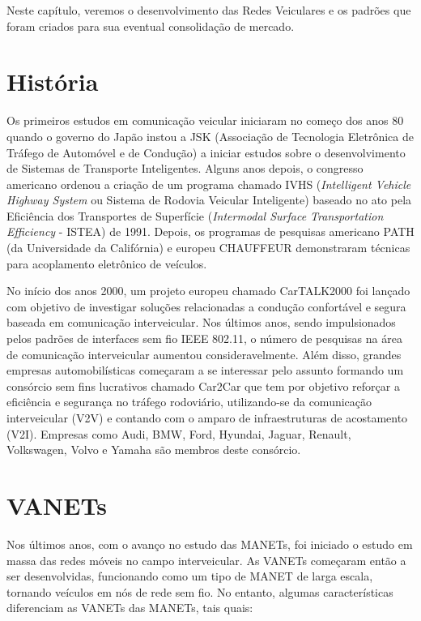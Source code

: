 \documentclass[
12pt,				%
openright,			%
oneside,			%
a4paper,			%
brazil,				%
]{abntex2}
\begin{document}
	\par Neste capítulo, veremos  o desenvolvimento das Redes Veiculares e os padrões que foram criados para sua eventual consolidação de mercado.
	
	\section{História}
	
	\indent Os primeiros estudos em comunicação veicular iniciaram no começo dos anos 80 quando o governo do Japão instou a JSK (Associação de Tecnologia Eletrônica de Tráfego de Automóvel e de Condução) a iniciar estudos sobre o desenvolvimento de Sistemas de Transporte Inteligentes. Alguns anos depois, o congresso americano ordenou a criação de um programa chamado IVHS (\textit{Intelligent Vehicle Highway System} ou Sistema de Rodovia Veicular Inteligente) baseado no ato pela Eficiência dos Transportes de Superfície (\textit{Intermodal Surface Transportation Efficiency} - ISTEA) de 1991. Depois, os programas de pesquisas americano PATH (da Universidade da Califórnia) e europeu CHAUFFEUR demonstraram técnicas para acoplamento eletrônico de veículos. 
	
	\par No início dos anos 2000, um projeto europeu chamado CarTALK2000 foi lançado com objetivo de investigar soluções relacionadas a condução confortável e segura baseada em comunicação interveicular. Nos últimos anos, sendo impulsionados pelos padrões de interfaces sem fio IEEE 802.11, o número de pesquisas na área de comunicação interveicular aumentou consideravelmente. Além disso, grandes empresas automobilísticas começaram a se interessar pelo assunto formando um consórcio sem fins lucrativos chamado Car2Car que tem por objetivo reforçar a eficiência e segurança no tráfego rodoviário, utilizando-se da comunicação interveicular (V2V) e contando com o amparo de infraestruturas de acostamento (V2I). Empresas como Audi, BMW, Ford, Hyundai, Jaguar, Renault, Volkswagen, Volvo e Yamaha são membros deste consórcio.
	
	\section{VANETs}
	
	\par Nos últimos anos, com o avanço no estudo das MANETs, foi iniciado o estudo em massa das redes móveis no campo interveicular. As VANETs começaram então a ser desenvolvidas, funcionando como um tipo de MANET de larga escala, tornando veículos em nós de rede sem fio. No entanto, algumas características diferenciam as VANETs das MANETs, tais quais:
	
\end{document}
